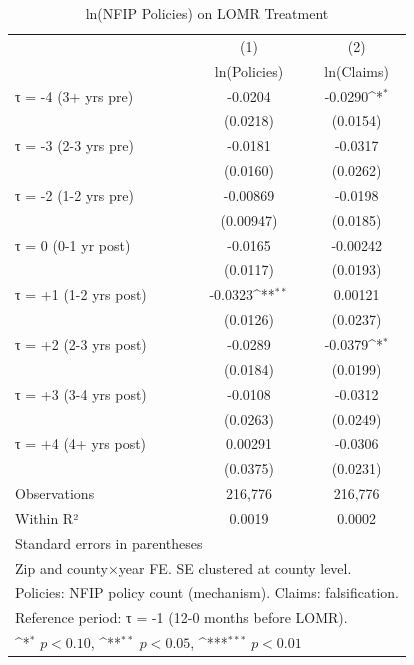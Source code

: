 \begin{table}[htbp]\centering
\def\sym#1{\ifmmode^{#1}\else\(^{#1}\)\fi}
\caption{ln(NFIP Policies) on LOMR Treatment}
\begin{tabular}{l*{2}{c}}
\hline\hline
                    &\multicolumn{1}{c}{(1)}&\multicolumn{1}{c}{(2)}\\
                    &\multicolumn{1}{c}{ln(Policies)}&\multicolumn{1}{c}{ln(Claims)}\\
\hline
τ = -4 (3+ yrs pre) &     -0.0204         &     -0.0290\sym{*}  \\
                    &    (0.0218)         &    (0.0154)         \\
[1em]
τ = -3 (2-3 yrs pre)&     -0.0181         &     -0.0317         \\
                    &    (0.0160)         &    (0.0262)         \\
[1em]
τ = -2 (1-2 yrs pre)&    -0.00869         &     -0.0198         \\
                    &   (0.00947)         &    (0.0185)         \\
[1em]
τ = 0 (0-1 yr post) &     -0.0165         &    -0.00242         \\
                    &    (0.0117)         &    (0.0193)         \\
[1em]
τ = +1 (1-2 yrs post)&     -0.0323\sym{**} &     0.00121         \\
                    &    (0.0126)         &    (0.0237)         \\
[1em]
τ = +2 (2-3 yrs post)&     -0.0289         &     -0.0379\sym{*}  \\
                    &    (0.0184)         &    (0.0199)         \\
[1em]
τ = +3 (3-4 yrs post)&     -0.0108         &     -0.0312         \\
                    &    (0.0263)         &    (0.0249)         \\
[1em]
τ = +4 (4+ yrs post)&     0.00291         &     -0.0306         \\
                    &    (0.0375)         &    (0.0231)         \\
\hline
Observations        &     216,776         &     216,776         \\
Within R²           &      0.0019         &      0.0002         \\
\hline\hline
\multicolumn{3}{l}{\footnotesize Standard errors in parentheses}\\
\multicolumn{3}{l}{\footnotesize Zip and county×year FE. SE clustered at county level.}\\
\multicolumn{3}{l}{\footnotesize Policies: NFIP policy count (mechanism). Claims: falsification.}\\
\multicolumn{3}{l}{\footnotesize Reference period: τ = -1 (12-0 months before LOMR).}\\
\multicolumn{3}{l}{\footnotesize \sym{*} \(p<0.10\), \sym{**} \(p<0.05\), \sym{***} \(p<0.01\)}\\
\end{tabular}
\end{table}
